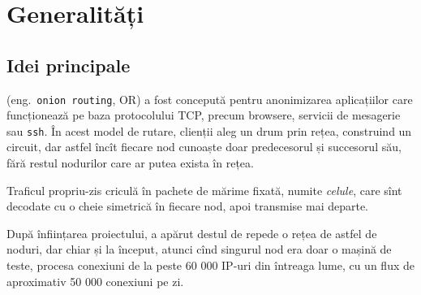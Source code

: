 
\chapter{Generalități}

\section{Idei principale} \label{sec:idei}

\indent\indent {} (eng.\ \texttt{onion routing}, OR) a fost
concepută pentru anonimizarea aplicațiilor care funcționează pe baza protocolului
TCP, precum browsere, servicii de mesagerie sau \texttt{ssh}. În acest model
de rutare, clienții aleg un drum prin rețea, construind un circuit, dar
astfel încît fiecare nod cunoaște doar predecesorul și succesorul său, fără restul
nodurilor care ar putea exista în rețea.

Traficul propriu-zis criculă în pachete de mărime fixată, numite \emph{celule},
 care sînt decodate cu o cheie simetrică în fiecare nod, apoi
transmise mai departe.

După înființarea proiectului, a apărut destul de repede o rețea de astfel de
noduri, dar chiar și la început, atunci cînd singurul nod era doar o mașină de teste,
procesa conexiuni de la peste 60 000 IP-uri din întreaga lume, cu un flux de
aproximativ 50 000 conexiuni pe zi.


